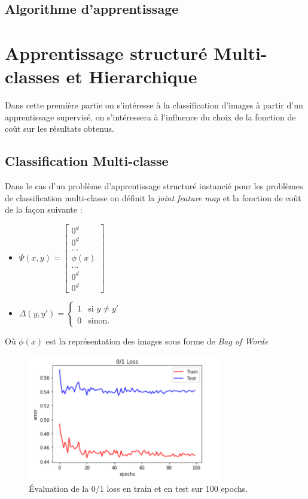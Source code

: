 \documentclass[a4paper]{article}
\begin{document}
\subsection{Algorithme d'apprentissage}

\section{Apprentissage structuré Multi-classes et Hierarchique}
Dans cette première partie on s'intéresse à la classification d'images à partir d'un apprentissage supervisé, on s'intéressera à l'influence du choix de la fonction de coût sur les résultats obtenus.
\subsection{Classification Multi-classe}
Dans le cas d'un problème d'apprentissage structuré instancié pour les problèmes de classification multi-classe on définit la \textit{joint feature map} et la fonction de coût de la façon suivante : 
\begin{itemize}
\item $\Psi(x,y) = \begin{bmatrix}  0^d\\0^d\\...\\ \phi(x) \\...\\0^d\\0^d \end{bmatrix} $   
\item $\Delta(y,y') = \left\{
    \begin{array}{ll}
        1 & \mbox{si } y \neq y' \\
        0 & \mbox{sinon.}
    \end{array}
\right.$
\end{itemize}
Où $\phi(x)$ est la représentation des images sous forme de \textit{Bag of Words}
\begin{figure}
\centering
\includegraphics[width=0.75\textwidth]{error.png}
\caption{\label{fig:data} Évaluation de la 0/1 loss en train et en test sur 100 epochs.}
\end{figure}
\end{document}
